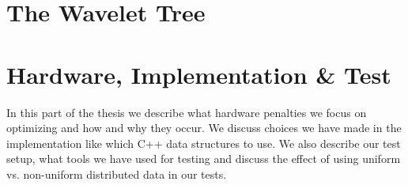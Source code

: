 \documentclass[11pt,twoside,openright]{article}
\begin{document}

\newpage
\tableofcontents
\newpage


\vspace*{\fill}

\vspace*{\fill}
\newpage

\part{The Wavelet Tree}









\newpage
\clearpage
\part{Hardware, Implementation \& Test}
In this part of the thesis we describe what hardware penalties we focus on optimizing and how and why they occur. 
We discuss choices we have made in the implementation like which C++ data structures to use. 
We also describe our test setup, what tools we have used for testing and discuss the effect of using uniform vs. non-uniform distributed data in our tests.
\end{document}
